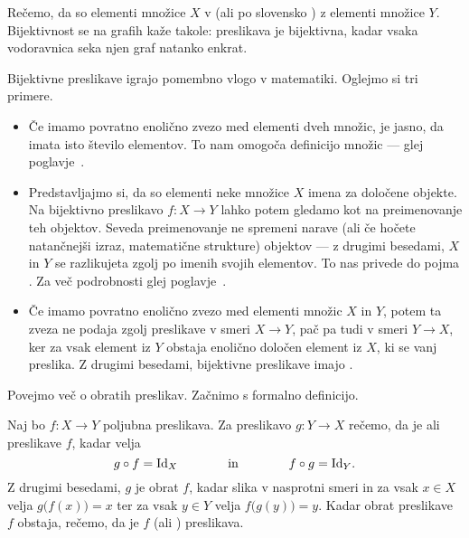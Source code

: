 
                Rečemo, da so elementi množice $X$ v  (ali po slovensko ) z elementi množice $Y$. Bijektivnost se na grafih kaže takole: preslikava je bijektivna, kadar vsaka vodoravnica seka njen graf natanko enkrat.

                Bijektivne preslikave igrajo pomembno vlogo v matematiki. Oglejmo si tri primere.
                \begin{itemize}
                        \item
                                Če imamo povratno enolično zvezo med elementi dveh množic, je jasno, da imata isto število elementov. To nam omogoča definicijo  množic --- glej poglavje~.
                        \item
                                Predstavljajmo si, da so elementi neke množice $X$ imena za določene objekte. Na bijektivno preslikavo $f\colon X \to Y$ lahko potem gledamo kot na preimenovanje teh objektov. Seveda preimenovanje ne spremeni narave (ali če hočete natančnejši izraz, matematične strukture) objektov --- z drugimi besedami, $X$ in $Y$ se razlikujeta zgolj po imenih svojih elementov. To nas privede do pojma . Za več podrobnosti glej poglavje~.
                        \item
                                Če imamo povratno enolično zvezo med elementi množic $X$ in $Y$, potem ta zveza ne podaja zgolj preslikave v smeri $X \to Y$, pač pa tudi v smeri $Y \to X$, ker za vsak element iz $Y$ obstaja enolično določen element iz $X$, ki se vanj preslika. Z drugimi besedami, bijektivne preslikave imajo .
                \end{itemize}

                Povejmo več o obratih preslikav. Začnimo s formalno definicijo.

                \begin{definicija}
                        Naj bo $f\colon X \to Y$ poljubna preslikava. Za preslikavo $g\colon Y \to X$ rečemo, da je  ali  preslikave $f$, kadar velja
                        \[g \circ f = \id[X] \qquad\qquad \text{in} \qquad\qquad f \circ g = \id[Y].\]
                        Z drugimi besedami, $g$ je obrat $f$, kadar slika v nasprotni smeri in za vsak $x \in X$ velja $g\big(f(x)\big) = x$ ter za vsak $y \in Y$ velja $f\big(g(y)\big) = y$. Kadar obrat preslikave $f$ obstaja, rečemo, da je $f$  (ali ) preslikava.
                \end{definicija}


